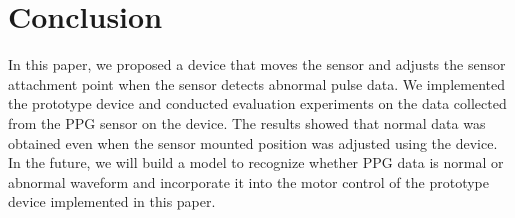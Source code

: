 \documentclass[sigconf]{acmart}
\begin{document}



\section{Conclusion}
\label{sec:conclution}
In this paper, we proposed a device that moves the sensor and adjusts the sensor attachment point when the sensor detects abnormal pulse data. We implemented the prototype device and conducted evaluation experiments on the data collected from the PPG sensor on the device.
The results showed that normal data was obtained even when the sensor mounted position was adjusted using the device. In the future, we will build a model to recognize whether PPG data is normal or abnormal waveform and incorporate it into the motor control of the prototype device implemented in this paper.

\end{document}
